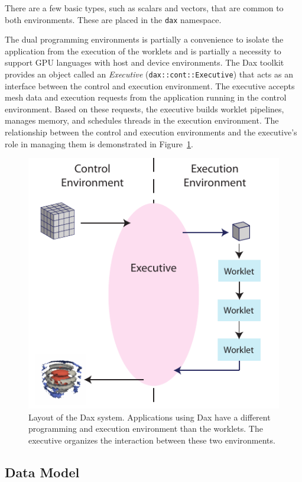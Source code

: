 \documentclass{vgtc}                          %
\newcommand*{\textC}[1]{\texttt{#1}}
\newcommand*{\keyterm}[1]{\emph{#1}}
\begin{document}
There are a few basic types, such as scalars and vectors, that are common
to both environments.  These are placed in the \textC{dax} namespace.

The dual programming environments is partially a convenience to isolate the
application from the execution of the worklets and is partially a necessity to
support GPU languages with host and device environments.  The Dax toolkit
provides an object called an \keyterm{Executive} (\textC{dax::cont::Executive}) that acts as an interface
between the control and execution environment.  The executive accepts mesh data
and execution requests from the application running in the control environment.
Based on these requests, the executive builds worklet pipelines, manages memory,
and schedules threads in the execution environment.  The relationship between
the control and execution environments and the executive's role in managing them
is demonstrated in Figure~\ref{fig:DaxDiagram}.

\begin{figure}[htbp]
  \centering
  \includegraphics{images/DaxDiagram}
  \caption{Layout of the Dax system.
    Applications using Dax have a different programming and execution environment than the worklets.
    The executive organizes the interaction between these two environments.}
  \label{fig:DaxDiagram}
\end{figure}

\subsection{Data Model}
\label{sec:DataModel}
\end{document}
